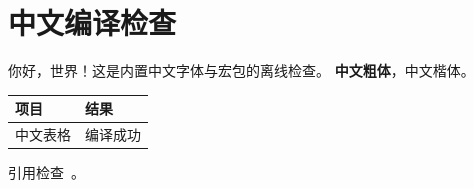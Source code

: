 \documentclass[UTF8]{ctexart}
\begin{document}
\section{中文编译检查}
你好，世界！这是内置中文字体与宏包的离线检查。
\textbf{中文粗体}，{\kaishu 中文楷体}。
\begin{tabular}{ll}
\toprule
项目 & 结果 \\
\midrule
中文表格 & 编译成功 \\
\bottomrule
\end{tabular}
引用检查~\cite{runtimecheck}。


\end{document}
